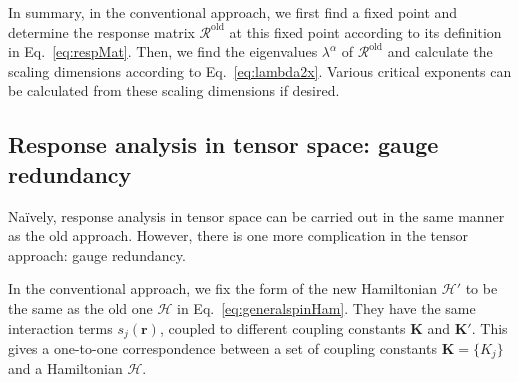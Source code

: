 \documentclass[aps,prb,reprint,superscriptaddress,floatfix]{revtex4-2}
\begin{document}
In summary, in the conventional approach, we first find a fixed point
and determine the response matrix $\mathcal{R}^{\text{old}}$ at this
fixed point according to its definition in Eq.~\eqref{eq:respMat}. Then,
we find the eigenvalues $\lambda^{\alpha}$ of $\mathcal{R}^{\text{old}}$
and calculate the scaling dimensions according to
Eq.~\eqref{eq:lambda2x}.  Various critical exponents can be calculated
from these scaling dimensions if desired. 

\subsection{Response analysis in tensor space: gauge redundancy}
Na\"ively, response analysis in tensor space can be carried out
in the same manner as the old approach. However, there is one more
complication in the tensor approach: gauge redundancy.
%

In the conventional approach, we fix the form of the new Hamiltonian
$\mathcal{H}'$ to be the same as the old one $\mathcal{H}$ in
Eq.~\eqref{eq:generalspinHam}. They have the same interaction terms
$s_j(\mathbf{r})$, coupled to different coupling constants
$\mathbf{K}$ and $\mathbf{K}'$. This gives a one-to-one correspondence
between a set of coupling constants $\mathbf{K} = \{K_j \}$ and a
Hamiltonian $\mathcal{H}$.
\end{document}
